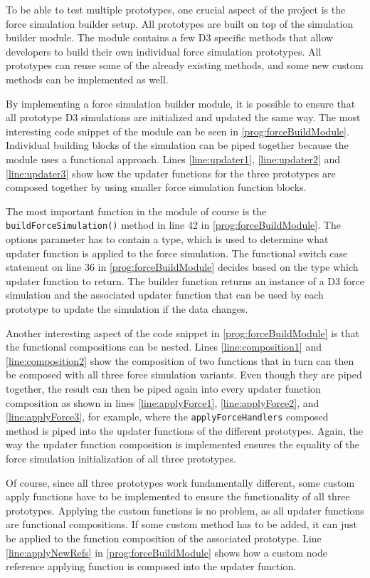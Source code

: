 To be able to test multiple prototypes, one crucial aspect of the project is the force simulation builder setup. All prototypes are built on top of the simulation builder module. The module contains a few D3 specific methods that allow developers to build their own individual force simulation prototypes. All prototypes can reuse some of the already existing methods, and some new custom methods can be implemented as well.

By implementing a force simulation builder module, it is possible to ensure that all prototype D3 simulations are initialized and updated the same way. The most interesting code snippet of the module can be seen in \ref{prog:forceBuildModule}. Individual building blocks of the simulation can be piped together because the module uses a functional approach. Lines \ref{line:updater1}, \ref{line:updater2} and \ref{line:updater3} show how the updater functions for the three prototypes are composed together by using smaller force simulation function blocks.

The most important function in the module of course is the \texttt{buildForceSimulation()} method in line 42 in \ref{prog:forceBuildModule}. The options parameter has to contain a type, which is used to determine what updater function is applied to the force simulation. The functional switch case statement on line 36 in \ref{prog:forceBuildModule} decides based on the type which updater function to return. The builder function returns an instance of a D3 force simulation and the associated updater function that can be used by each prototype to update the simulation if the data changes.

Another interesting aspect of the code snippet in \ref{prog:forceBuildModule} is that the functional compositions can be nested. Lines \ref{line:composition1} and \ref{line:composition2} show the composition of two functions that in turn can then be composed with all three force simulation variants. Even though they are piped together, the result can then be piped again into every updater function composition as shown in lines \ref{line:applyForce1}, \ref{line:applyForce2}, and \ref{line:applyForce3}, for example, where the \texttt{applyForceHandlers} composed method is piped into the updater functions of the different prototypes. Again, the way the updater function composition is implemented ensures the equality of the force simulation initialization of all three prototypes.

Of course, since all three prototypes work fundamentally different, some custom apply functions have to be implemented to ensure the functionality of all three prototypes. Applying the custom functions is no problem, as all updater functions are functional compositions. If some custom method has to be added, it can just be applied to the function composition of the associated prototype. Line \ref{line:applyNewRefs} in \ref{prog:forceBuildModule} shows how a custom node reference applying function is composed into the updater function.

